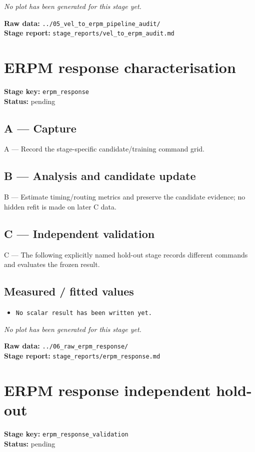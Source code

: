 \documentclass[11pt,a4paper]{article}
\begin{document}
\textit{No plot has been generated for this stage yet.}

\vfill
\textbf{Raw data:} \texttt{../05\_vel\_to\_erpm\_pipeline\_audit/}\\
\textbf{Stage report:} \texttt{stage\_reports/vel\_to\_erpm\_audit.md}
\clearpage
\small
\section*{ERPM response characterisation}
\textbf{Stage key:} \texttt{erpm\_response}\\
\textbf{Status:} pending\\

\subsection*{A --- Capture}
A — Record the stage-specific candidate/training command grid.

\subsection*{B --- Analysis and candidate update}
B — Estimate timing/routing metrics and preserve the candidate evidence; no hidden refit is made on later C data.

\subsection*{C --- Independent validation}
C — The following explicitly named hold-out stage records different commands and evaluates the frozen result.

\subsection*{Measured / fitted values}
\begin{itemize}\setlength\itemsep{0pt}
\item \texttt{No scalar result has been written yet.}
\end{itemize}

\textit{No plot has been generated for this stage yet.}

\vfill
\textbf{Raw data:} \texttt{../06\_raw\_erpm\_response/}\\
\textbf{Stage report:} \texttt{stage\_reports/erpm\_response.md}
\clearpage
\small
\section*{ERPM response independent hold-out}
\textbf{Stage key:} \texttt{erpm\_response\_validation}\\
\textbf{Status:} pending\\
\end{document}
